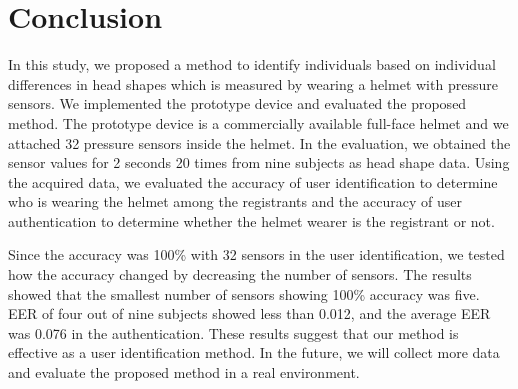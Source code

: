 \documentclass[sigchi,authordraft]{acmart}
\begin{document}
\section{Conclusion}
\label{sec:conclusion}
In this study, we proposed a method to identify individuals based on individual differences in head shapes which is measured by wearing a helmet with pressure sensors. We implemented the prototype device and evaluated the proposed method. The prototype device is a commercially available full-face helmet and we attached 32 pressure sensors inside the helmet. In the evaluation, we obtained the sensor values for 2 seconds 20 times from nine subjects as head shape data. Using the acquired data, we evaluated the accuracy of user identification to determine who is wearing the helmet among the registrants and the accuracy of user authentication to determine whether the helmet wearer is the registrant or not.\par


Since the accuracy was 100\% with 32 sensors in the user identification, we tested how the accuracy changed by decreasing the number of sensors. The results showed that the smallest number of sensors showing 100\% accuracy was five. EER of four out of nine subjects showed less than 0.012, and the average EER was 0.076 in the authentication. These results suggest that our method is effective as a user identification method. In the future, we will collect more data and evaluate the proposed method in a real environment.

\end{document}
